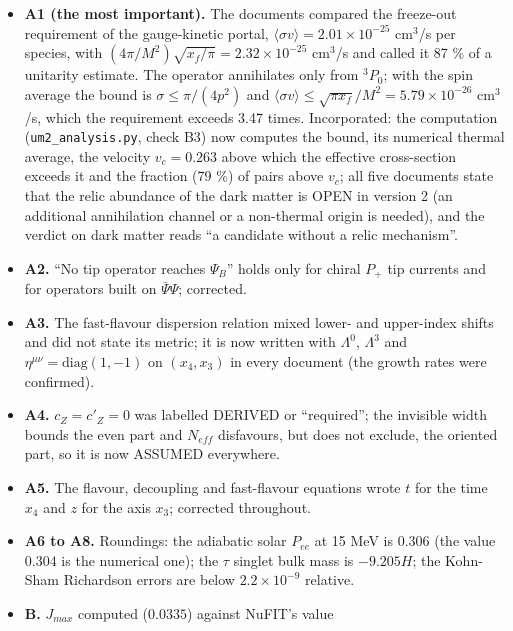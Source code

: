 \documentclass[
  10pt,
]{article}
\providecommand{\tightlist}{%
  \setlength{\itemsep}{0pt}\setlength{\parskip}{0pt}}
\begin{document}
\begin{itemize}
\tightlist
\item
  \textbf{A1 (the most important).} The documents compared the
  freeze-out requirement of the gauge-kinetic portal,
  \(\langle\sigma v\rangle = 2.01\times10^{-25}\) cm\(^3\)/s per
  species, with \((4\pi/M^2)\sqrt{x_f/\pi} = 2.32\times10^{-25}\)
  cm\(^3\)/s and called it 87 \% of a unitarity estimate. The operator
  annihilates only from \(^3P_0\); with the spin average the bound is
  \(\sigma \le \pi/(4p^2)\) and
  \(\langle\sigma v\rangle \le \sqrt{\pi x_f}/M^2 = 5.79\times10^{-26}\)
  cm\(^3\)/s, which the requirement exceeds 3.47 times. Incorporated:
  the computation (\texttt{um2\_analysis.py}, check B3) now computes the
  bound, its numerical thermal average, the velocity \(v_c = 0.263\)
  above which the effective cross-section exceeds it and the fraction
  (79 \%) of pairs above \(v_c\); all five documents state that the
  relic abundance of the dark matter is OPEN in version 2 (an additional
  annihilation channel or a non-thermal origin is needed), and the
  verdict on dark matter reads ``a candidate without a relic
  mechanism''.
\item
  \textbf{A2.} ``No tip operator reaches \(\Psi_B\)'' holds only for
  chiral \(P_+\) tip currents and for operators built on
  \(\bar\Psi\Psi\); corrected.
\item
  \textbf{A3.} The fast-flavour dispersion relation mixed lower- and
  upper-index shifts and did not state its metric; it is now written
  with \(\Lambda^0\), \(\Lambda^3\) and
  \(\eta^{\mu\nu} = \mathrm{diag}(1, -1)\) on \((x_4, x_3)\) in every
  document (the growth rates were confirmed).
\item
  \textbf{A4.} \(c_Z = c'_Z = 0\) was labelled DERIVED or ``required'';
  the invisible width bounds the even part and \(N_{eff}\) disfavours,
  but does not exclude, the oriented part, so it is now ASSUMED
  everywhere.
\item
  \textbf{A5.} The flavour, decoupling and fast-flavour equations wrote
  \(t\) for the time \(x_4\) and \(z\) for the axis \(x_3\); corrected
  throughout.
\item
  \textbf{A6 to A8.} Roundings: the adiabatic solar \(P_{ee}\) at 15 MeV
  is \(0.306\) (the value \(0.304\) is the numerical one); the \(\tau\)
  singlet bulk mass is \(-9.205H\); the Kohn-Sham Richardson errors are
  below \(2.2\times10^{-9}\) relative.
\item
  \textbf{B.} \(J_{max}\) computed (\(0.0335\)) against NuFIT's value

\end{itemize}
\end{document}
